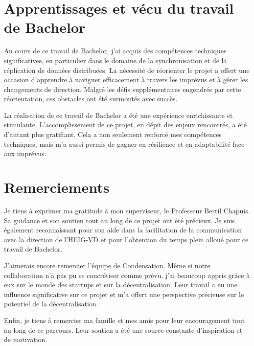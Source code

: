 \section{Apprentissages et vécu du travail de Bachelor}

Au cours de ce travail de Bachelor, j'ai acquis des compétences techniques significatives, en particulier dans le domaine de la synchronisation et de la réplication de données distribuées. La nécessité de réorienter le projet a offert une occasion d'apprendre à naviguer efficacement à travers les imprévus et à gérer les changements de direction. Malgré les défis supplémentaires engendrés par cette réorientation, ces obstacles ont été surmontés avec succès.

La réalisation de ce travail de Bachelor a été une expérience enrichissante et stimulante. L'accomplissement de ce projet, en dépit des enjeux rencontrés, a été d'autant plus gratifiant. Cela a non seulement renforcé mes compétences techniques, mais m'a aussi permis de gagner en résilience et en adaptabilité face aux imprévus.

\section{Remerciements}

Je tiens à exprimer ma gratitude à mon superviseur, le Professeur Bertil Chapuis. Sa guidance et son soutien tout au long de ce projet ont été précieux. Je suis également reconnaissant pour son aide dans la facilitation de la communication avec la direction de l'HEIG-VD et pour l'obtention du temps plein alloué pour ce travail de Bachelor.

J'aimerais encore remercier l'équipe de Condensation. Même si notre collaboration n'a pas pu se concrétiser comme prévu, j'ai beaucoup appris grâce à eux sur le monde des startups et sur la décentralisation. Leur travail a eu une influence significative sur ce projet et m'a offert une perspective précieuse sur le potentiel de la décentralisation.

Enfin, je tiens à remercier ma famille et mes amis pour leur encouragement tout au long de ce parcours. Leur soutien a été une source constante d'inspiration et de motivation.

\hspace{8cm}\makeatletter\@author\makeatother\par
\hspace{8cm}\begin{minipage}{5cm}
\end{minipage}
\printsignature